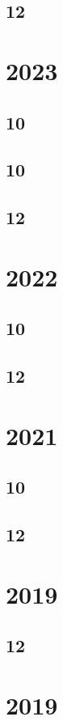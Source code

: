 \documentclass[11pt]{book}
\begin{document}
\subsection{12}

\section{2023}
\subsection{10}

\subsection{10}

\subsection{12}

\section{2022}
\subsection{10}

\subsection{12}

\section{2021}
\subsection{10}

\subsection{12}

\section{2019}
\subsection{12}


\section{2019}
\end{document}
